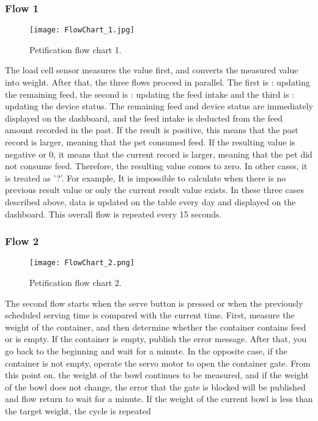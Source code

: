 \documentclass[conference]{IEEEtran}
\begin{document}
\subsubsection{Flow 1}
\begin{figure}[htbp]
\centerline{\texttt{[image: FlowChart\_1.jpg]}}
\caption{Petification flow chart 1.}
\label{fig}
\end{figure}
The load cell sensor measures the value first, and converts the measured value into weight. After that, the three flows proceed in parallel. The first is : updating the remaining feed, the second is : updating the feed intake and the third is : updating the device status.
The remaining feed and device status are immediately displayed on the dashboard, and the feed intake is deducted from the feed amount recorded in the past. If the result is positive, this means that the past record is larger, meaning that the pet consumed feed.
If the resulting value is negative or 0, it means that the current record is larger, meaning that the pet did not consume feed. Therefore, the resulting value comes to zero. In other cases, it is treated as '?'. For example, It is impossible to calculate when there is no previous result value or only the current result value exists. In these three cases described above, data is updated on the table every day and displayed on the dashboard. This overall flow is repeated every 15 seconds.

\hfill \break
\subsubsection{Flow 2}
\begin{figure}[htbp]
\centerline{\texttt{[image: FlowChart\_2.png]}}
\caption{Petification flow chart 2.}
\label{fig}
\end{figure}
The second flow starts when the serve button is pressed or when the previously scheduled serving time is compared with the current time.
First, measure the weight of the container, and then determine whether the container contains feed or is empty. If the container is empty, publish the error message. After that, you go back to the beginning and wait for a minute.
In the opposite case, if the container is not empty, operate the servo motor to open the container gate. From this point on, the weight of the bowl continues to be measured, and if the weight of the bowl does not change, the error that the gate is blocked will be published and flow return to wait for a minute.
If the weight of the current bowl is less than the target weight, the cycle is repeated
\end{document}
